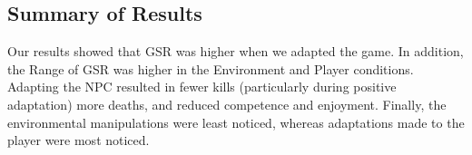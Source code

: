 \subsection{Summary of Results}
Our results showed that GSR was higher when we adapted the game. In addition, the Range of GSR was higher in the Environment and Player conditions. Adapting the NPC resulted in fewer kills (particularly during positive adaptation) more deaths, and reduced competence and enjoyment. Finally, the environmental manipulations were least noticed, whereas adaptations made to the player were most noticed.




